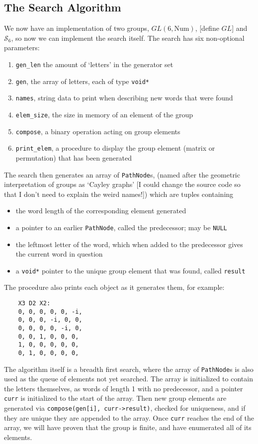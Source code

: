 \subsection{The Search Algorithm}
We now have an implementation of two groups, $GL(6, \text{Num})$, [define $GL$] and $\mathcal{S}_6$, so now we can implement the search itself. The search has six non-optional parameters:
\begin{enumerate}
	\item \verb`gen_len` the amount of `letters' in the generator set
	\item \verb`gen`, the array of letters, each of type \verb`void*`
	\item \verb`names`, string data to print when describing new words that were found
	\item \verb`elem_size`, the size in memory of an element of the group
	\item \verb`compose`, a binary operation acting on group elements
	\item \verb`print_elem`, a procedure to display the group element (matrix or permutation) that has been generated
\end{enumerate}
The search then generates an array of \verb`PathNode`s, (named after the geometric interpretation of groups as `Cayley graphs' [I could change the source code so that I don't need to explain the weird names!]) which are tuples containing
\begin{itemize}
	\item the word length of the corresponding element generated
	\item a pointer to an earlier \verb`PathNode`, called the predecessor; may be \verb`NULL`
	\item the leftmost letter of the word, which when added to the predecessor gives the current word in question
	\item a \verb`void*` pointer to the unique group element that was found, called \verb`result`
\end{itemize}
The procedure also prints each object as it generates them, for example:
\begin{verbatim}
	X3 D2 X2:
	0, 0, 0, 0, 0, -i, 
	0, 0, 0, -i, 0, 0, 
	0, 0, 0, 0, -i, 0, 
	0, 0, 1, 0, 0, 0, 
	1, 0, 0, 0, 0, 0, 
	0, 1, 0, 0, 0, 0, 
\end{verbatim}

The algorithm itself is a breadth first search, where the array of \verb`PathNode`s is also used as the queue of elements not yet searched. The array is initialized to contain the letters themselves, as words of length 1 with no predecessor, and a pointer \verb`curr` is initialized to the start of the array. Then new group elements are generated via \verb`compose(gen[i], curr->result)`, checked for uniqueness, and if they are unique they are appended to the array. Once \verb`curr` reaches the end of the array, we will have proven that the group is finite, and have enumerated all of its elements.

